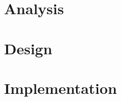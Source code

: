 \documentclass[ twoside,openright,titlepage,numbers=noenddot,headinclude,%
                footinclude=true,cleardoublepage=empty,abstractoff, %
                BCOR=5mm,paper=a4,fontsize=11pt,%
                ngerman,american,%
                ]{scrreprt}
\begin{document}
\chapter{Analysis}
\label{cha:analysis}




\chapter{Design}
\label{cha:design}

%
%
%
%

\chapter{Implementation}
\label{cha:implementation}

\end{document}
